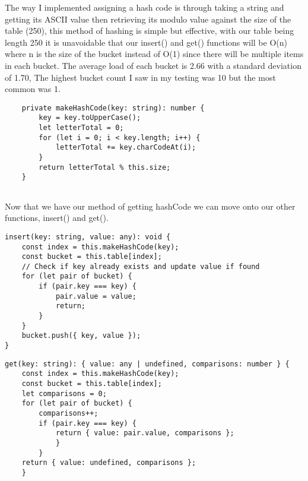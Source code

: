 \documentclass[12pt,letterpaper, onecolumn]{exam}
\begin{document}
\vspace{.3cm}
\centering The way I implemented assigning a hash code is through taking a string and getting its ASCII value then retrieving its modulo value against the size of the table (250), this method of hashing is simple but effective, with our table being length 250 it is unavoidable that our insert() and get() functions will be O(n) where n is the size of the bucket instead of O(1) since there will be multiple items in each bucket. The average load of each bucket is 2.66 with a standard deviation of 1.70, The highest bucket count I saw in my testing was 10 but the most common was 1. 
\vspace{.2cm}
\begin{lstlisting}
    private makeHashCode(key: string): number {
        key = key.toUpperCase();
        let letterTotal = 0;
        for (let i = 0; i < key.length; i++) {
            letterTotal += key.charCodeAt(i);
        }
        return letterTotal % this.size;
    }


\end{lstlisting}

\vspace{.2cm}

\centering Now that we have our method of getting hashCode we can move onto our other functions, insert() and get().

\begin{minipage}[t]{0.45\textwidth} %
  \begin{lstlisting}[caption= insert(), ]
insert(key: string, value: any): void {
    const index = this.makeHashCode(key);
    const bucket = this.table[index];
    // Check if key already exists and update value if found
    for (let pair of bucket) {
        if (pair.key === key) {
            pair.value = value;
            return;
        }
    }
    bucket.push({ key, value });
}
  \end{lstlisting}
\end{minipage}
\hfill
\begin{minipage}[t]{0.45\textwidth} %
  \begin{lstlisting}[caption=get()]
get(key: string): { value: any | undefined, comparisons: number } {
    const index = this.makeHashCode(key);
    const bucket = this.table[index];
    let comparisons = 0;
    for (let pair of bucket) {
        comparisons++; 
        if (pair.key === key) {
            return { value: pair.value, comparisons };
            }
        }
    return { value: undefined, comparisons };
    }
  \end{lstlisting}
\end{minipage}
\end{document}
